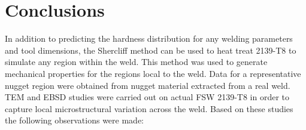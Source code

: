 	\section{Conclusions}
	\label{Conclusion}
	In addition to predicting the hardness distribution for any welding parameters and tool dimensions, the Shercliff method can be used to heat treat 2139-T8 to simulate any region within the weld. This method was used to generate mechanical properties for the regions local to the weld. Data for a representative nugget region were obtained from nugget material extracted from a real weld. TEM and EBSD studies were carried out on actual FSW 2139-T8 in order to capture local microstructural variation across the weld. Based on these studies the following observations were made:
	
